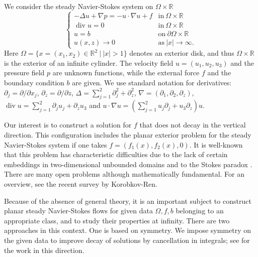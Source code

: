 \documentclass[11pt,a4paper]{article}
\numberwithin{equation}{section}
\newcommand{\R}{\mathbb{R}}
\newcommand{\opdiv}{\operatorname{div}}
\begin{document}
We consider the steady Navier-Stokes system on $\Omega\times\R$ 
%
\begin{equation}\tag{NS}\label{intro.eq.NS}
\left\{
\begin{array}{ll}
-\Delta u + \nabla p 
= -u\cdot\nabla u + f&\mbox{in}\ \Omega\times\R \\
\opdiv u = 0&\mbox{in}\ \Omega\times\R \\
u= b &\mbox{on}\ \partial\Omega\times\R \\
u(x,z)\to0&\mbox{as}\ |x|\to\infty. 
\end{array}\right.
\end{equation}
%
Here $\Omega=\{x=(x_1,x_2)\in\R^2~|~|x|>1\}$ denotes an exterior disk, and thus $\Omega\times\R$ is the exterior of an infinite cylinder. The velocity field $u=(u_1,u_2,u_3)$ and the pressure field $p$ are unknown functions, while the external force $f$ and the boundary condition $b$ are given. We use standard notation for derivatives: $\partial_j = \partial/\partial x_j$, $\partial_z = \partial/\partial z$, $\Delta = \sum_{j=1}^2 \partial^2_j + \partial_z^2$, $\nabla = (\partial_1, \partial_2, \partial_z)$, $\opdiv u = \sum_{j=1}^2 \partial_j u_j + \partial_z u_3$ and $u\cdot \nabla u = (\sum_{j=1}^2 u_j \partial_j + u_3\partial_z) u$.


Our interest is to construct a solution for $f$ that does not decay in the vertical direction. This configuration includes the planar exterior problem for the steady Navier-Stokes system if one takes $f=(f_1(x),f_2(x),0)$. It is well-known that this problem has characteristic difficulties due to the lack of certain embeddings in two-dimensional unbounded domains and to the Stokes paradox \cite{CF1961, KS1992, Galdi2004, Russo2010, Galdi2011}. There are many open problems although mathematically fundamental. For an overview, see the recent survey \cite{KR2023} by Korobkov-Ren. 


Because of the absence of general theory, it is an important subject to construct planar steady Navier-Stokes flows for given data $\Omega,f,b$ belonging to an appropriate class, and to study their properties at infinity. There are two approaches in this context. One is based on symmetry. We impose symmetry on the given data to improve decay of solutions by cancellation in integrals; see \cite{Galdi2004, Russo2009, Galdi2011, Yamazaki2011, PR2012, Yamazaki2016, Yamazaki2018} for the work in this direction. 
\end{document}
